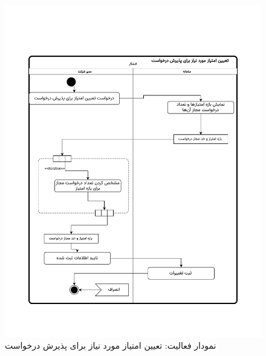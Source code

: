 \begin{figure}[ht!]
	\centering
	\includegraphics[scale=0.8]{figs/OOD-activity-41.pdf}
	\caption{نمودار فعالیت: تعیین امتیاز مورد نیاز برای پذیرش درخواست}
\end{figure}
\FloatBarrier
\newpage



